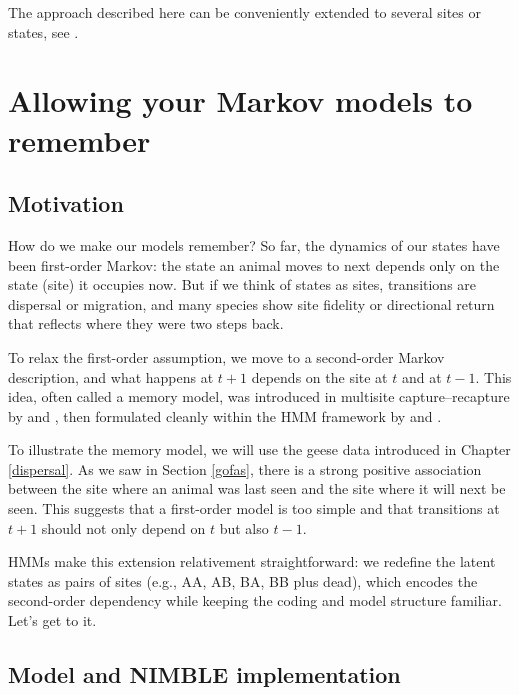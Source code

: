 \documentclass[
  12pt,
]{krantz}
\begin{document}
The approach described here can be conveniently extended to several sites or states, see \citet{pradeltrapdep2012}.

\section{Allowing your Markov models to remember}\label{memorymodel}

\subsection{Motivation}\label{motivation-4}

How do we make our models remember? So far, the dynamics of our states have been first-order Markov: the state an animal moves to next depends only on the state (site) it occupies now. But if we think of states as sites, transitions are dispersal or migration, and many species show site fidelity or directional return that reflects where they were two steps back.

To relax the first-order assumption, we move to a second-order Markov description, and what happens at \(t+1\) depends on the site at \(t\) and at \(t−1\). This idea, often called a memory model, was introduced in multisite capture--recapture by \citet{hestbeck1991estimates} and \citet{BrownieEtAl1993}, then formulated cleanly within the HMM framework by \citet{rouan2009memory} and \citet{pradel_multievent_2005}.

To illustrate the memory model, we will use the geese data introduced in Chapter \ref{dispersal}. As we saw in Section \ref{gofas}, there is a strong positive association between the site where an animal was last seen and the site where it will next be seen. This suggests that a first-order model is too simple and that transitions at \(t+1\) should not only depend on \(t\) but also \(t-1\).

HMMs make this extension relativement straightforward: we redefine the latent states as pairs of sites (e.g., AA, AB, BA, BB plus dead), which encodes the second-order dependency while keeping the coding and model structure familiar. Let's get to it.

\subsection{Model and NIMBLE implementation}\label{model-and-nimble-implementation-4}
\end{document}
